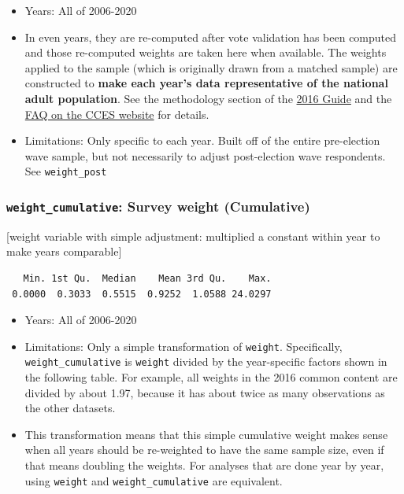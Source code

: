 \documentclass[10pt,article,oneside]{memoir}
\theoremstyle{definition}
\begin{document}
\begin{itemize}
\tightlist
\item
  Years: All of 2006-2020
\item
  In even years, they are re-computed after vote validation has been
  computed and those re-computed weights are taken here when available.
  The weights applied to the sample (which is originally drawn from a
  matched sample) are constructed to \textbf{make each year's data
  representative of the national adult population}. See the methodology
  section of the
  \href{https://dataverse.harvard.edu/api/access/datafile/3047286}{2016
  Guide} and the
  \href{https://cces.gov.harvard.edu/frequently-asked-questions}{FAQ on
  the CCES website} for details.
\item
  Limitations: Only specific to each year. Built off of the entire
  pre-election wave sample, but not necessarily to adjust post-election
  wave respondents. See \texttt{weight\_post}
\end{itemize}

\hypertarget{weight_cumulative-survey-weight-cumulative}{%
\subsubsection{\texorpdfstring{\texttt{weight\_cumulative}: Survey
weight
(Cumulative)}{weight\_cumulative: Survey weight (Cumulative)}}\label{weight_cumulative-survey-weight-cumulative}}

{[}weight variable with simple adjustment: multiplied a constant within
year to make years comparable{]}

\begin{verbatim}
   Min. 1st Qu.  Median    Mean 3rd Qu.    Max. 
 0.0000  0.3033  0.5515  0.9252  1.0588 24.0297 
\end{verbatim}

\begin{itemize}
\tightlist
\item
  Years: All of 2006-2020
\item
  Limitations: Only a simple transformation of \texttt{weight}.
  Specifically, \texttt{weight\_cumulative} is \texttt{weight} divided
  by the year-specific factors shown in the following table. For
  example, all weights in the 2016 common content are divided by about
  1.97, because it has about twice as many observations as the other
  datasets.
\item
  This transformation means that this simple cumulative weight makes
  sense when all years should be re-weighted to have the same sample
  size, even if that means doubling the weights. For analyses that are
  done year by year, using \texttt{weight} and
  \texttt{weight\_cumulative} are equivalent.
\end{itemize}
\end{document}
